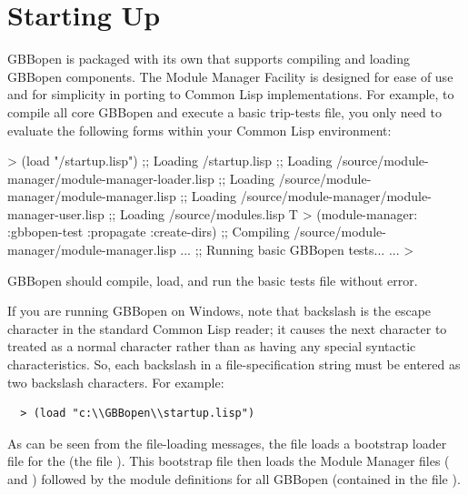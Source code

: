 \documentclass[10pt,twoside,english,pdftex]{article}
\begin{document}

\T\markright{}%
\T\pagestyle{plain}
\T\cleardoublepage
\W{}
\T\pagestyle{fancy}
\T\thispagestyle{fancybottom}
\T\global\def\fnlastname{ }%
\section{Starting Up}
\label{sec:startup}%

GBBopen is packaged with its own  that
supports compiling and loading GBBopen components.  The Module Manager Facility
is designed for ease of use and for simplicity in porting to Common Lisp
implementations.  For example, to compile all core GBBopen  and
execute a basic trip-tests file, you only need to evaluate the following forms
within your Common Lisp environment:
%
\W\supp
\begin{example}
  > (load "/startup.lisp")
  ;; Loading /startup.lisp
  ;;  Loading /source/module-manager/module-manager-loader.lisp
  ;;   Loading /source/module-manager/module-manager.lisp
  ;;     Loading /source/module-manager/module-manager-user.lisp
  ;;  Loading /source/modules.lisp
  T
  > (module-manager: :gbbopen-test :propagate :create-dirs)
  ;; Compiling /source/module-manager/module-manager.lisp
       ...
  ;; Running basic GBBopen tests...
       ...
  >
\end{example}
%
GBBopen should compile, load, and run the basic tests file without error.

%
%
If you are running GBBopen on Windows, note that backslash is the
escape character in the standard Common Lisp reader; it causes the
next character to treated as a normal character rather than as having
any special syntactic characteristics. So, each backslash in a
file-specification string must be entered as two backslash characters.
For example:
%
\W\supp
\begin{verbatim}
  > (load "c:\\GBBopen\\startup.lisp")
\end{verbatim}
%
As can be seen from the file-loading messages, the 
file loads a bootstrap loader file for the  (the file
).  This
bootstrap file then loads the Module Manager files
( and
) followed by the
module definitions for all GBBopen  (contained in the file
).
\end{document}
